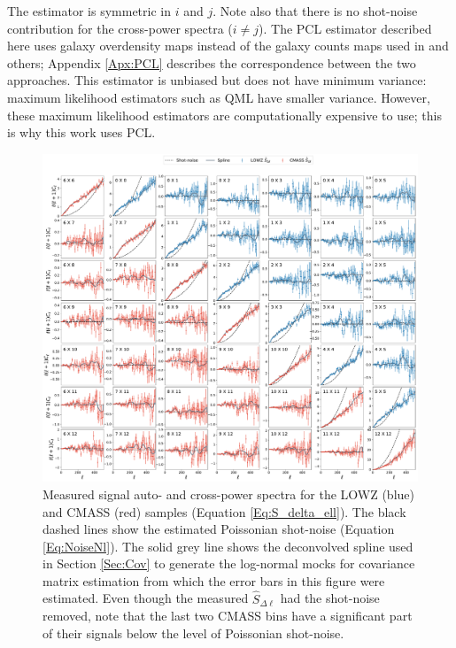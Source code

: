 \noindent The estimator is symmetric in $i$ and $j$. Note also that there is no shot-noise contribution for the cross-power spectra ($i \neq j$). The PCL estimator described here uses galaxy overdensity maps instead of the galaxy counts maps used in \cite{Blake2007,Thomas2011} and others; Appendix \ref{Apx:PCL} describes the correspondence between the two approaches. This estimator is unbiased \citep{Peebles1973} but does not have minimum variance: maximum likelihood estimators such as QML \citep[e.g.][]{Efstat2004} have smaller variance. However, these maximum likelihood estimators are computationally expensive to use; this is why this work uses PCL. %

\begin{figure}
\begin{center}
\includegraphics[width=1.0\textwidth]{BOSS-FIGS/PCL-data_red3.pdf}
\caption[Measured angular power spectra from the BOSS samples.]{Measured signal auto- and cross-power spectra for the LOWZ (blue) and CMASS (red) samples (Equation \ref{Eq:S_delta_ell}). The black dashed lines show the estimated Poissonian shot-noise (Equation \ref{Eq:NoiseNl}). The solid grey line shows the deconvolved spline used in Section \ref{Sec:Cov} to generate the log-normal mocks for covariance matrix estimation from which the error bars in this figure were estimated. Even though the measured $\hat{S}_{\Delta\ell}$ had the shot-noise removed, note that the last two CMASS bins have a significant part of their signals below the level of Poissonian shot-noise.}
\label{fig:PCLs}
\end{center}
\end{figure}

